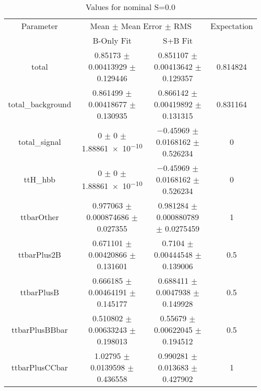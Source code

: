 \begin{table}
\centering
\caption{Values for nominal S=0.0}
\begin{tabular}{cccc}
\toprule
Parameter & \multicolumn{2}{c}{Mean $\pm$ Mean Error $\pm$ RMS} & Expectation\\
 & B-Only Fit & S+B Fit & \\
\midrule
total & \num{0.85173} $\pm$ \num{0.00413929} $\pm$ \num{0.129446} & \num{0.851107} $\pm$ \num{0.00413642} $\pm$ \num{0.129357} & \num{0.814824}\\
total\_background & \num{0.861499} $\pm$ \num{0.00418677} $\pm$ \num{0.130935} & \num{0.866142} $\pm$ \num{0.00419892} $\pm$ \num{0.131315} & \num{0.831164}\\
total\_signal & \num{0} $\pm$ \num{0} $\pm$ \num{1.88861e-10} & \num{-0.45969} $\pm$ \num{0.0168162} $\pm$ \num{0.526234} & \num{0}\\
ttH\_hbb & \num{0} $\pm$ \num{0} $\pm$ \num{1.88861e-10} & \num{-0.45969} $\pm$ \num{0.0168162} $\pm$ \num{0.526234} & \num{0}\\
ttbarOther & \num{0.977063} $\pm$ \num{0.000874686} $\pm$ \num{0.027355} & \num{0.981284} $\pm$ \num{0.000880789} $\pm$ \num{0.0275459} & \num{1}\\
ttbarPlus2B & \num{0.671101} $\pm$ \num{0.00420866} $\pm$ \num{0.131601} & \num{0.7104} $\pm$ \num{0.00444548} $\pm$ \num{0.139006} & \num{0.5}\\
ttbarPlusB & \num{0.666185} $\pm$ \num{0.00464191} $\pm$ \num{0.145177} & \num{0.688411} $\pm$ \num{0.0047938} $\pm$ \num{0.149928} & \num{0.5}\\
ttbarPlusBBbar & \num{0.510802} $\pm$ \num{0.00633243} $\pm$ \num{0.198013} & \num{0.55679} $\pm$ \num{0.00622045} $\pm$ \num{0.194512} & \num{0.5}\\
ttbarPlusCCbar & \num{1.02795} $\pm$ \num{0.0139598} $\pm$ \num{0.436558} & \num{0.990281} $\pm$ \num{0.013683} $\pm$ \num{0.427902} & \num{1}\\
\bottomrule
\end{tabular}
\end{table}